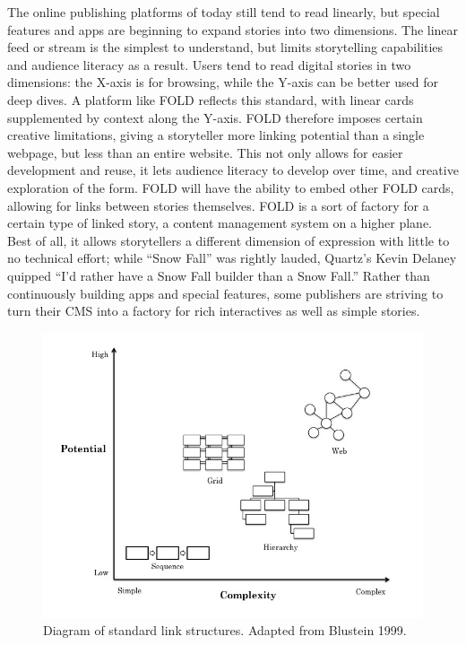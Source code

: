 The online publishing platforms of today still tend to read linearly, but special features and apps are beginning to expand stories into two dimensions. The linear feed or stream is the simplest to understand, but limits storytelling capabilities and audience literacy as a result. Users tend to read digital stories in two dimensions: the X-axis is for browsing, while the Y-axis can be better used for deep dives.\autocite{samis_x_2015} A platform like FOLD reflects this standard, with linear cards supplemented by context along the Y-axis. FOLD therefore imposes certain creative limitations, giving a storyteller more linking potential than a single webpage, but less than an entire website. This not only allows for easier development and reuse, it lets audience literacy to develop over time, and creative exploration of the form. FOLD will have the ability to embed other FOLD cards, allowing for links between stories themselves. FOLD is a sort of factory for a certain type of linked story, a content management system on a higher plane. Best of all, it allows storytellers a different dimension of expression with little to no technical effort; while ``Snow Fall'' was rightly lauded, Quartz's Kevin Delaney quipped ``I'd rather have a Snow Fall builder than a Snow Fall.''\autocite[36]{_innovation_2014} Rather than continuously building apps and special features, some publishers are striving to turn their CMS into a factory for rich interactives as well as simple stories.

\begin{figure}[ht]
\centering
\includegraphics[width=6.0in]{figures/linkstructures-custom}
\caption{Diagram of standard link structures. Adapted from Blustein 1999.}
\label{fig:linkstructures-custom}
\end{figure}
\nocite{blustein_hypertext_1999}

